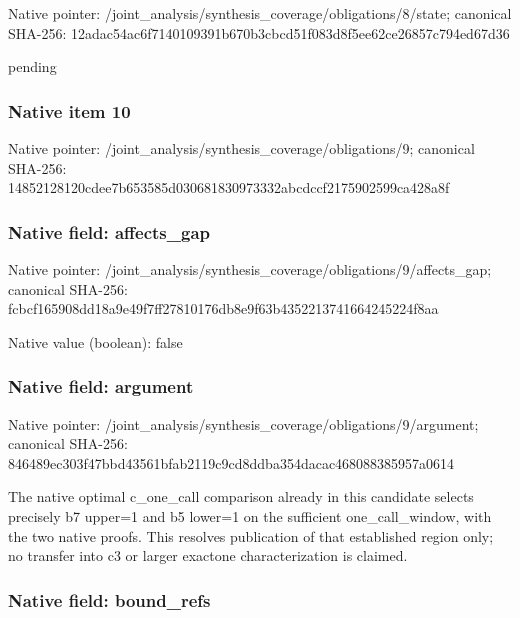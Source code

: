 \documentclass[10pt,a4paper]{article}
\begin{document}
Native pointer: /joint\_analysis/synthesi\allowbreak{}s\_coverage/obligations/8\allowbreak{}/state; canonical SHA-256: 12adac54ac6f7140109391b6\allowbreak{}70b3cbcd51f083d8f5ee62ce\allowbreak{}26857c794ed67d36


pending


\subsubsection{Native item 10}


Native pointer: /joint\_analysis/synthesi\allowbreak{}s\_coverage/obligations/9; canonical SHA-256: 14852128120cdee7b653585d\allowbreak{}030681830973332abcdccf21\allowbreak{}75902599ca428a8f



\subsubsection{Native field: affects\_gap}


Native pointer: /joint\_analysis/synthesi\allowbreak{}s\_coverage/obligations/9\allowbreak{}/affects\_gap; canonical SHA-256: fcbcf165908dd18a9e49f7ff\allowbreak{}27810176db8e9f63b4352213\allowbreak{}741664245224f8aa



Native value (boolean): false



\subsubsection{Native field: argument}


Native pointer: /joint\_analysis/synthesi\allowbreak{}s\_coverage/obligations/9\allowbreak{}/argument; canonical SHA-256: 846489ec303f47bbd43561bf\allowbreak{}ab2119c9cd8ddba354dacac4\allowbreak{}68088385957a0614


The native optimal c\_one\_call comparison already in this candidate selects precisely b7 upper=1 and b5 lower=1 on the sufficient one\_call\_window, with the two native proofs. This resolves publication of that established region only; no transfer into c3 or larger exactone characterization is claimed.


\subsubsection{Native field: bound\_refs}
\end{document}
